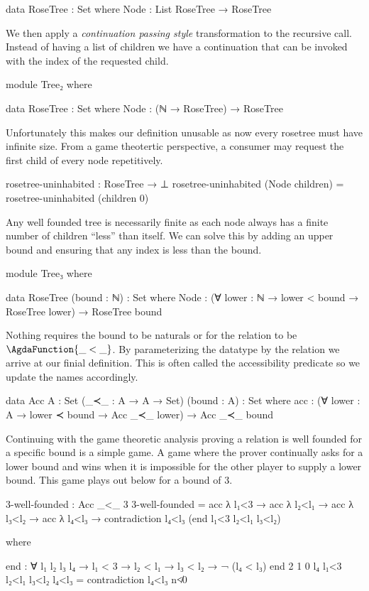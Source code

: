 \documentclass[./Thesis.tex]{subfiles}
\begin{document}
\begin{code}
    data RoseTree : Set where
      Node : List RoseTree → RoseTree
\end{code}
We then apply a \textit{continuation passing style} \cite{harper} transformation to the
recursive call. Instead of having a list of children we have a continuation that
can be invoked with the index of the requested child.
\begin{code}[hide]
  module Tree₂ where
\end{code}
\begin{code}
    data RoseTree : Set where
      Node : (ℕ → RoseTree) → RoseTree
\end{code}
Unfortunately this makes our definition unusable as now every rosetree must have
infinite size. From a game theotertic perspective, a consumer may request
the first child of every node repetitively.
\begin{code}
    rosetree-uninhabited : RoseTree → ⊥
    rosetree-uninhabited (Node children) = rosetree-uninhabited (children 0)
\end{code}
Any well founded tree is necessarily finite as each node always has a finite
number of children ``less'' than itself. We can solve this by adding an upper
bound and ensuring that any index is less than the bound.
\begin{code}[hide]
  module Tree₃ where
\end{code}
\begin{code}
    data RoseTree (bound : ℕ) : Set where
      Node : (∀ {lower : ℕ} → lower < bound → RoseTree lower)
           → RoseTree bound
\end{code}
Nothing requires the bound to be naturals or for the relation to be
$\AgdaFunction{\_<\_}$. By parameterizing the datatype by the relation we
arrive at our finial definition. This is often called the accessibility
predicate so we update the names accordingly.
\begin{code}
  data Acc {A : Set} (_≺_ : A → A → Set) (bound : A) : Set where
    acc : (∀ {lower : A} → lower ≺ bound → Acc _≺_ lower)
        → Acc _≺_ bound
\end{code}
Continuing with the game theoretic analysis proving a relation is well
founded for a specific bound is a simple game. A game where the prover
continually asks for a lower bound and wins when it is impossible for the
other player to supply a lower bound. This game plays out below for a bound of $3$.
\begin{code}
  3-well-founded : Acc _<_ 3
  3-well-founded = acc λ l₁<3 → acc λ l₂<l₁ → acc λ l₃<l₂ → acc λ l₄<l₃ →
    contradiction l₄<l₃ (end l₁<3 l₂<l₁ l₃<l₂)
\end{code}
\begin{code}[hide]
    where
\end{code}
\begin{code}
    end : ∀ {l₁ l₂ l₃ l₄} → l₁ < 3 → l₂ < l₁ → l₃ < l₂ → ¬ (l₄ < l₃)
    end {2} {1} {0} {l₄} l₁<3 l₂<l₁ l₃<l₂ l₄<l₃ = contradiction l₄<l₃ n≮0 
\end{code}
\end{document}
